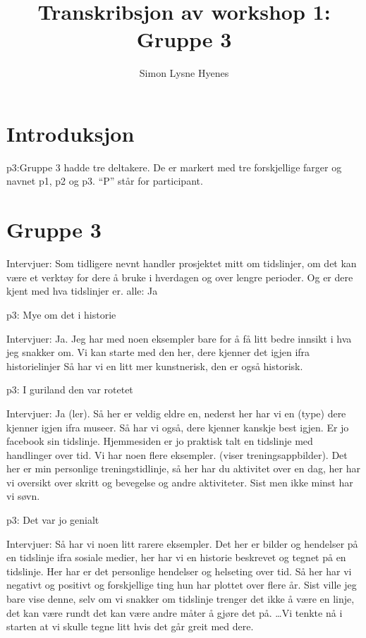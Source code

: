 \documentclass[11pt,UKenglish, a4paper]{article}
\author{Simon Lysne Hyenes}
\title{Transkribsjon av workshop 1: Gruppe 3}
\begin{document}
\maketitle{}
\section{Introduksjon}
\textcolor{myR} {p3:}Gruppe 3 hadde tre deltakere. De er markert med tre forskjellige farger og navnet p1, p2 og p3. ``P'' står for participant. 

\section{Gruppe 3}

\textcolor{myBlue} {Intervjuer:} Som tidligere nevnt handler prosjektet mitt om tidslinjer, om det kan være et verktøy for dere å bruke i hverdagen og over lengre perioder. Og er dere kjent med hva tidslinjer er.
alle: Ja

\textcolor{myR} {p3:} Mye om det i historie

\textcolor{myBlue} {Intervjuer:} Ja. Jeg har med noen eksempler bare for å få litt bedre innsikt i hva jeg snakker om. Vi kan starte med den her, dere kjenner det igjen ifra historielinjer Så har vi en litt mer kunstnerisk, den er også historisk.

\textcolor{myR} {p3:} I guriland den var rotetet

\textcolor{myBlue} {Intervjuer:} Ja (ler). Så her er veldig eldre en, nederst her har vi en (type) dere kjenner igjen ifra museer. Så har vi også, dere kjenner kanskje best igjen. Er jo facebook sin tidslinje. Hjemmesiden er jo praktisk talt en tidslinje med handlinger over tid. Vi har noen flere eksempler. (viser treningsappbilder). Det her er min personlige treningstidlinje, så her har du aktivitet over en dag, her har vi oversikt over skritt og bevegelse og andre aktiviteter. Sist men ikke minst har vi søvn. 

\textcolor{myR} {p3:} Det var jo genialt

\textcolor{myBlue} {Intervjuer:} Så har vi noen litt rarere eksempler. Det her er bilder og hendelser på en tidslinje ifra sosiale medier, her har vi en historie beskrevet og tegnet på en tidslinje. Her har er det personlige hendelser og helseting over tid. Så her har vi negativt og positivt og forskjellige ting hun har plottet over flere år. Sist ville jeg bare vise denne, selv om vi snakker om tidslinje trenger det ikke å være en linje, det kan være rundt det kan være andre måter å gjøre det på. \dots Vi tenkte nå i starten at vi skulle tegne litt hvis det går greit med dere. 
\end{document}
